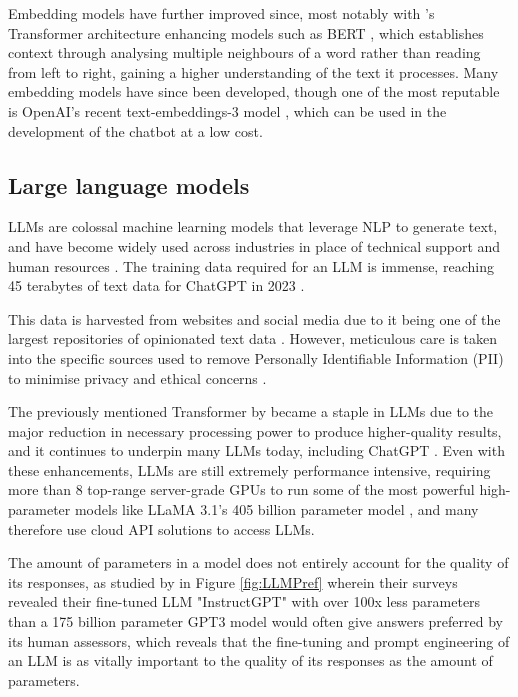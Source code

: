 \documentclass[12pt]{report}
\begin{document}
    Embedding models have further improved since, most notably with \textcite{vaswani_attention_2017}'s Transformer architecture enhancing models such as 
    BERT \autocite{devlin_bert_2019}, which establishes context through analysing multiple neighbours of a word rather than reading from left to right,
    gaining a higher understanding of the text it processes. Many embedding models have since been developed, though one of the most reputable is OpenAI's 
    recent text-embeddings-3 model \autocite{openai_vector_nodate}, which can be used in the development of the chatbot at a low cost. 
    

    \pagebreak 

    \subsection{Large language models}

    LLMs are colossal machine learning models that leverage NLP to generate text, and have become widely used across 
    industries in place of technical support and human resources \autocite{vrontis_artificial_2022}. The training data required for an LLM is immense, 
    reaching 45 terabytes of text data for ChatGPT in 2023 \autocite{dwivedi_so_2023}. 
    
    This data is harvested from websites \autocite{dubey_llama_2024}
    and social media due to it being one of the largest repositories of opinionated text data \autocite{wang_fine-grained_2016}. 
    However, meticulous care is taken into the specific sources used to remove 
    Personally Identifiable Information (PII) to minimise privacy and ethical concerns \autocite{dubey_llama_2024}.
    
    The previously mentioned Transformer by \textcite{vaswani_attention_2017} 
    became a staple in LLMs due to the major reduction in necessary processing power to produce higher-quality 
    results, and it continues to underpin many LLMs today, including ChatGPT \autocite{brown_language_2020}. 
    Even with these enhancements, LLMs are still extremely performance intensive,
    requiring more than 8 top-range server-grade GPUs to run some of the most powerful high-parameter models like LLaMA 3.1's 405 billion parameter model \autocite{dubey_llama_2024},
    and many therefore use cloud API solutions to access LLMs.
    
    The amount of parameters in a model does not entirely account for the quality of its responses, as studied by \textcite{ouyang_training_2022}
    in Figure \ref{fig:LLMPref} wherein their surveys revealed their fine-tuned LLM "InstructGPT" with over 100x less parameters than a 175 billion parameter 
    GPT3 model would often give answers preferred by its human assessors, which reveals that the fine-tuning and prompt engineering of an LLM is as vitally important
    to the quality of its responses as the amount of parameters.  
    
\end{document}
